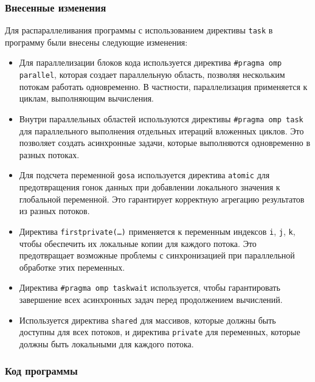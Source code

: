 \documentclass[a4paper, 11pt]{article}
\begin{document}
\subsubsection*{Внесенные изменения}
Для распараллеливания программы с использованием директивы \texttt{task} в программу были внесены следующие изменения:

\begin{itemize}
    \item Для параллелизации блоков кода используется директива \texttt{\#pragma omp parallel}, которая создает параллельную область, позволяя нескольким потокам работать одновременно. В частности, параллелизация применяется к циклам, выполняющим вычисления.
    \item Внутри параллельных областей используются директивы \texttt{\#pragma omp task} для параллельного выполнения отдельных итераций вложенных циклов. Это позволяет создать асинхронные задачи, которые выполняются одновременно в разных потоках.
    \item Для подсчета переменной \texttt{gosa} используется директива \texttt{atomic} для предотвращения гонок данных при добавлении локального значения к глобальной переменной. Это гарантирует корректную агрегацию результатов из разных потоков.
    \item Директива \texttt{firstprivate(\ldots)} применяется к переменным индексов \texttt{i}, \texttt{j}, \texttt{k}, чтобы обеспечить их локальные копии для каждого потока. Это предотвращает возможные проблемы с синхронизацией при параллельной обработке этих переменных.
    \item Директива \texttt{\#pragma omp taskwait} используется, чтобы гарантировать завершение всех асинхронных задач перед продолжением вычислений.
    \item Используется директива \texttt{shared} для массивов, которые должны быть доступны для всех потоков, и директива \texttt{private} для переменных, которые должны быть локальными для каждого потока.
\end{itemize}
\newpage

\subsubsection*{Код программы}
\end{document}
